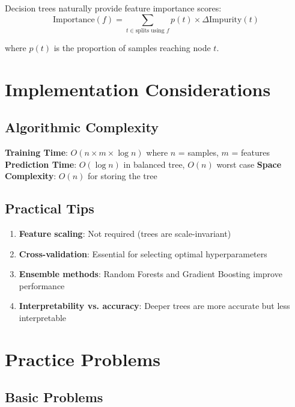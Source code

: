 \documentclass{article}
\begin{document}
Decision trees naturally provide feature importance scores:
$$\text{Importance}(f) = \sum_{t \in \text{splits using } f} p(t) \times \Delta\text{Impurity}(t)$$

where $p(t)$ is the proportion of samples reaching node $t$.

\section{Implementation Considerations}

\subsection{Algorithmic Complexity}

\textbf{Training Time}: $O(n \times m \times \log n)$ where $n$ = samples, $m$ = features
\textbf{Prediction Time}: $O(\log n)$ in balanced tree, $O(n)$ worst case
\textbf{Space Complexity}: $O(n)$ for storing the tree

\subsection{Practical Tips}

\begin{enumerate}
    \item \textbf{Feature scaling}: Not required (trees are scale-invariant)
    \item \textbf{Cross-validation}: Essential for selecting optimal hyperparameters
    \item \textbf{Ensemble methods}: Random Forests and Gradient Boosting improve performance
    \item \textbf{Interpretability vs. accuracy}: Deeper trees are more accurate but less interpretable
\end{enumerate}

\section{Practice Problems}

\subsection{Basic Problems}
\end{document}
